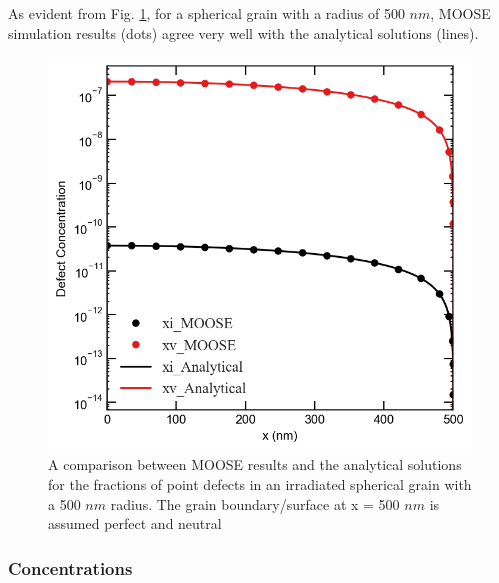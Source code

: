 \documentclass[utf8]{frontiersSCNS} %
\begin{document}
    As evident from Fig. \ref{figure:concentrations_MOOSE_analytical}, for a spherical grain with a radius of 500 $nm$, MOOSE simulation results (dots) agree very well with the analytical solutions (lines). 
 
    \begin{figure}[h!]
        \centering
        \includegraphics[scale=0.55]{Fig1}
        \caption{A comparison between MOOSE results and the analytical solutions for the fractions of point defects in an irradiated spherical grain with a 500 $nm$ radius. The grain boundary/surface at x = 500 $nm$ is assumed perfect and neutral}
        \label{figure:concentrations_MOOSE_analytical}
    \end{figure}

 \subsubsection{Concentrations}
 
\end{document}
